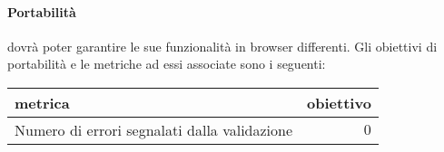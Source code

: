 	\paragraph{Portabilità}
	\proj{} dovrà poter garantire le sue funzionalità in browser differenti. Gli obiettivi di portabilità e le metriche ad essi associate sono i seguenti:
	\begin{center}
	\begin{tabular}{| l | r |}
		\hline
		\textbf{metrica} & \textbf{obiettivo} \\
		\hline
		Numero di errori segnalati dalla validazione \gloss{W3C} & $0$ \\
		\hline
	\end{tabular}
	\end{center}

		
